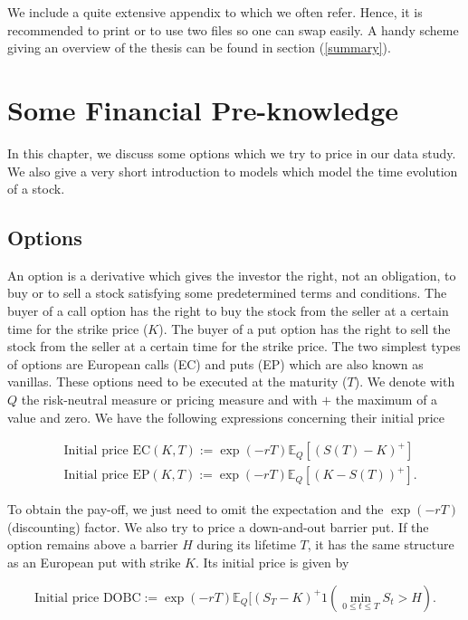 \documentclass[12pt,a4paper,oneside]{book}
\begin{document}
We include a quite extensive appendix to which we often refer. Hence, it is recommended to print or to use two files so one can swap easily. A handy scheme giving an overview of the thesis can be found in section (\ref{summary}).

\chapter{Some Financial Pre-knowledge}

In this chapter, we discuss some options which we try to price in our data study. We also give a very short introduction to models which model the time evolution of a stock. 

\section{Options}\label{Options}

An option is a derivative which gives the investor the right, not an obligation, to buy or to sell a stock satisfying some predetermined terms and conditions. The buyer of a call option has the right to buy the stock from the seller at a certain time for the strike price ($K$). The buyer of a put option has the right to sell the stock from the seller at a certain time for the strike price. The two simplest types of options are European calls (EC) and puts (EP) which are also known as vanillas. These options need to be executed at the maturity ($T$). We denote with $Q$ the risk-neutral measure or pricing measure and with $+$ the maximum of a value and zero. We have the following expressions concerning their initial price

\begin{align}\label{price_vanillas}
&\text{Initial price EC}(K,T) :=  \exp{(-rT)} \mathbb{E}_{Q} [(S(T) - K)^{+} ] \\
&\text{Initial price EP}(K,T) :=  \exp{(-rT)} \mathbb{E}_{Q}[ (K - S(T))^{+}].
\end{align}

To obtain the pay-off, we just need to omit the expectation and the $\exp{(-rT)}$ (discounting) factor. We also try to price a down-and-out barrier put. If the option remains above a barrier $H$ during its lifetime $T$, it has the same structure as an European put with strike $K$. Its initial price is given by 

\begin{equation}
\text{Initial price DOBC} := \exp{(-rT)} \mathbb{E}_{Q}[(S_T-K)^{+} 1( \min\limits_{0 \leq t \leq T} S_t > H). 
\end{equation}
\end{document}
